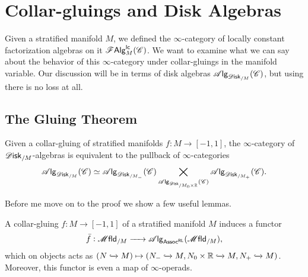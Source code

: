 \documentclass[../text]{subfiles}
\begin{document}
\section{Collar-gluings and Disk Algebras}\label{ch:gluing_disk_alg}

Given a stratified manifold $M$, we defined the $\infty$-category of locally constant factorization algebras on it $\mathscr{F} \mathsf{Alg}^{\mathsf{lc}}_M (\mathscr{C})$. We want to examine what we can say about the behavior of this $\infty$-category under collar-gluings in the manifold variable. Our discussion will be in terms of disk algebras $\alg{\disk_{/M}} (\catC)$, but using  there is no loss at all.

\subsection{The Gluing Theorem}

\begin{theorem}\label{thm:gluing_alg_disk/M}
    Given a collar-gluing of stratified manifolds $f: M \rightarrow [-1,1]$, the $\infty$-category of $\disk_{/M}$-algebras is equivalent to the pullback of $\infty$-categories
    \begin{equation}
        \alg{\disk_{/M}} (\catC) \simeq \alg{\disk_{/M_-}} (\catC) \bigtimes_{\alg{\disk_{/M_0 \times \mathbb{R}}} (\catC)} \alg{\disk_{/M_+}} (\catC).
    \end{equation}
\end{theorem}

Before me move on to the proof we show a few useful lemmas.

\begin{lemma}\label{lem:fbar_func}
    A collar-gluing $f:M \xrightarrow{} [-1,1]$ of a stratified manifold $M$ induces a functor
    \begin{equation}
        \bar{f}: \mfld_{/M} \xrightarrow{\ \ \ \ } \alg{\mathsf{Assoc^{RL}}} (\mfld_{/M}),
    \end{equation}
    which on objects acts as $(N \xhookrightarrow{} M) \mapsto (N_- \xhookrightarrow{} M, N_0 \times \mathbb{R} \xhookrightarrow{} M, N_+ \xhookrightarrow{} M)$. Moreover, this functor is even a map of $\infty$-operads.
\end{lemma}
\end{document}
